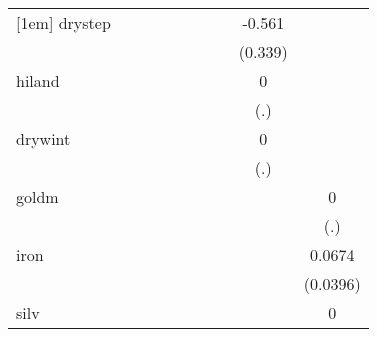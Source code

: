 {\begin{tabular}{l*{9}{c}}
[1em]
drystep     &                     &                     &                     &                     &                     &                     &                     &      -0.561         &                     \\
            &                     &                     &                     &                     &                     &                     &                     &     (0.339)         &                     \\
[1em]
hiland      &                     &                     &                     &                     &                     &                     &                     &           0         &                     \\
            &                     &                     &                     &                     &                     &                     &                     &         (.)         &                     \\
[1em]
drywint     &                     &                     &                     &                     &                     &                     &                     &           0         &                     \\
            &                     &                     &                     &                     &                     &                     &                     &         (.)         &                     \\
[1em]
goldm       &                     &                     &                     &                     &                     &                     &                     &                     &           0         \\
            &                     &                     &                     &                     &                     &                     &                     &                     &         (.)         \\
[1em]
iron        &                     &                     &                     &                     &                     &                     &                     &                     &      0.0674\sym{*}  \\
            &                     &                     &                     &                     &                     &                     &                     &                     &    (0.0396)         \\
[1em]
silv        &                     &                     &                     &                     &                     &                     &                     &                     &           0         \\

\end{tabular}}
